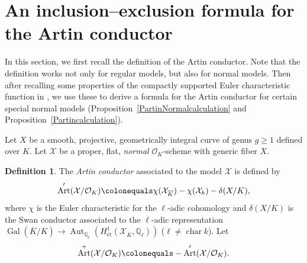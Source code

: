 \documentclass[12pt]{amsart}
\numberwithin{equation}{section}
\theoremstyle{definition}
\newtheorem{defn}[equation]{Definition}
\newcommand{\mc}[1]{\mathcal{#1}}
\newcommand{\Q}{\mathbb Q}
\DeclareMathOperator{\Gal}{Gal}
\DeclareMathOperator{\cha}{char}
\DeclareMathOperator{\Art}{Art}
\DeclareMathOperator{\Aut}{Aut}
\begin{document}
\section{An inclusion--exclusion formula for the Artin conductor}\label{SEulerchar}




In this section, we first recall the definition of the Artin conductor.  Note that the definition works not only for regular models, but also for normal models. Then after recalling
some properties of the compactly supported Euler characteristic
function in , we use these to derive a formula
for the Artin conductor for certain special normal models
(Proposition~\ref{PartinNormalcalculation} and
Proposition~\ref{Partincalculation}). 



Let $X$ be a smooth, projective, geometrically integral curve of genus $g \geq 1$ defined
over $K$.  Let $\mc{X}$ be a proper, flat, \emph{normal} $\mc{O}_K$-scheme with generic fiber $X$. 
\begin{defn}\label{DArtNormal}
The \emph{Artin conductor} associated to the model $\mc{X}$ is defined by
\[ \Art' (\mc{X}/\mc{O}_K) \colonequals  \chi(\mc{X}_{\overline{K}}) - \chi(\mc{X}_{k}) - \delta(X/K) ,\]
where $\chi$ is the Euler characteristic for the $\ell$-adic cohomology and $\delta(X/K)$ is the Swan conductor associated to the $\ell$-adic representation $\Gal (\overline{K}/K) \rightarrow \Aut_{\Q_\ell}
(H^1_{\mathrm{et}}(\mc{X}_{\overline{K}}, \Q_\ell))$ ($\ell \neq \cha k$).  Let \[\Art^+ (\mc{X}/\mc{O}_K) \colonequals -\Art' (\mc{X}/\mc{O}_K).\]
\end{defn}
\end{document}
